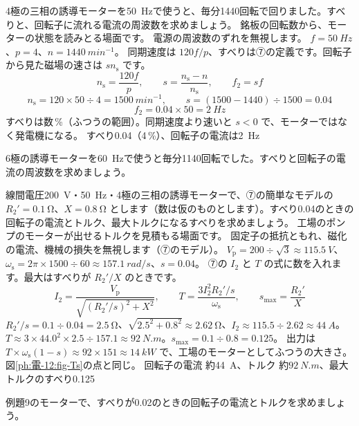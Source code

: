 \label{ph:電-12:ex8}
\begin{phreidai}[誘導モーターのすべり]
4極の三相の誘導モーターを\qty{50}{Hz}で使うと、毎分1440回転で回りました。すべりと、回転子に流れる電流の周波数を求めましょう。
\phbamen
銘板の回転数から、モーターの状態を読みとる場面です。
\phmushi
電源の周波数のずれを無視します。
\phzu
$f=\qty{50}{Hz}$、$p=4$、$n=\qty{1440}{min^{-1}}$。
\phriyu
同期速度は $120f/p$、すべりは⑦の定義です。回転子から見た磁場の速さは $sn_{\mathrm s}$ です。
\phtateru
\[n_{\mathrm s}=\frac{120f}{p},\qquad s=\frac{n_{\mathrm s}-n}{n_{\mathrm s}},\qquad f_2=sf\]
\phtoku
\[n_{\mathrm s}=120\times50\div4=\qty{1500}{min^{-1}},\qquad s=(1500-1440)\div1500=0.04\]
\[f_2=0.04\times50=\qty{2}{Hz}\]
\phtashikame
すべりは数\,\%（ふつうの範囲）。同期速度より速いと $s<0$ で、モーターではなく発電機になる。
\kotae すべり0.04（4\,\%）、回転子の電流は\qty{2}{Hz}
\end{phreidai}
\begin{jibun}
6極の誘導モーターを\qty{60}{Hz}で使うと毎分1140回転でした。すべりと回転子の電流の周波数を求めましょう。
\end{jibun}

\label{ph:電-12:ex9}
\begin{phreidai}[誘導モーターのトルク]
線間電圧\qty{200}{V}・\qty{50}{Hz}・4極の三相の誘導モーターで、⑦の簡単なモデルの $R_2'=\qty{0.1}{\ohm}$、$X=\qty{0.8}{\ohm}$ とします（数は仮のものとします）。すべり0.04のときの回転子の電流とトルク、最大トルクになるすべりを求めましょう。
\phbamen
工場のポンプのモーターが出せるトルクを見積もる場面です。
\phmushi
固定子の抵抗ともれ、磁化の電流、機械の損失を無視します（⑦のモデル）。
\phzu
$V_{\mathrm p}=200\div\sqrt3\approx\qty{115.5}{V}$、$\omega_{\mathrm s}=2\pi\times1500\div60\approx\qty{157.1}{rad/s}$、$s=0.04$。
\phriyu
⑦の $I_2$ と $T$ の式に数を入れます。最大はすべりが $R_2'/X$ のときです。
\phtateru
\[I_2=\frac{V_{\mathrm p}}{\sqrt{(R_2'/s)^2+X^2}},\qquad T=\frac{3I_2^2R_2'/s}{\omega_{\mathrm s}},\qquad s_{\max}=\frac{R_2'}{X}\]
\phtoku
$R_2'/s=0.1\div0.04=\qty{2.5}{\ohm}$、$\sqrt{2.5^2+0.8^2}\approx\qty{2.62}{\ohm}$、$I_2\approx115.5\div2.62\approx\qty{44}{A}$。\\
$T\approx3\times44.0^2\times2.5\div157.1\approx\qty{92}{N.m}$。$s_{\max}=0.1\div0.8=0.125$。
\phtashikame
出力は $T\times\omega_{\mathrm s}(1-s)\approx92\times151\approx\qty{14}{kW}$ で、工場のモーターとしてふつうの大きさ。図\ref{ph:電-12:fig-Ts}の点と同じ。
\kotae 回転子の電流 約\qty{44}{A}、トルク 約$\qty{92}{N.m}$、最大トルクのすべり0.125
\end{phreidai}
\begin{jibun}
例題9のモーターで、すべりが0.02のときの回転子の電流とトルクを求めましょう。
\end{jibun}

